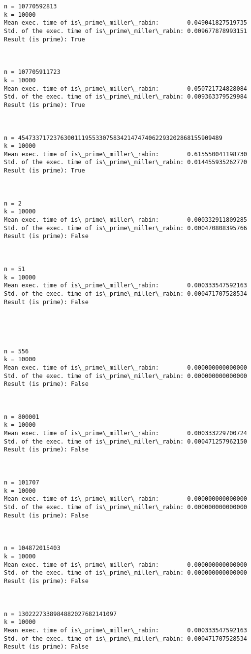 \documentclass[11pt]{article}
\begin{document}
\begin{Verbatim}[commandchars=\\\{\}]
n = 10770592813
k = 10000
Mean exec. time of is\_prime\_miller\_rabin:        0.049041827519735
Std. of the exec. time of is\_prime\_miller\_rabin: 0.009677878993151
Result (is prime): True



n = 107705911723
k = 10000
Mean exec. time of is\_prime\_miller\_rabin:        0.050721724828084
Std. of the exec. time of is\_prime\_miller\_rabin: 0.009363379529984
Result (is prime): True



n = 4547337172376300111955330758342147474062293202868155909489
k = 10000
Mean exec. time of is\_prime\_miller\_rabin:        0.615550041198730
Std. of the exec. time of is\_prime\_miller\_rabin: 0.014455935262770
Result (is prime): True



n = 2
k = 10000
Mean exec. time of is\_prime\_miller\_rabin:        0.000332911809285
Std. of the exec. time of is\_prime\_miller\_rabin: 0.000470808395766
Result (is prime): False



n = 51
k = 10000
Mean exec. time of is\_prime\_miller\_rabin:        0.000333547592163
Std. of the exec. time of is\_prime\_miller\_rabin: 0.000471707528534
Result (is prime): False





n = 556
k = 10000
Mean exec. time of is\_prime\_miller\_rabin:        0.000000000000000
Std. of the exec. time of is\_prime\_miller\_rabin: 0.000000000000000
Result (is prime): False



n = 800001
k = 10000
Mean exec. time of is\_prime\_miller\_rabin:        0.000333229700724
Std. of the exec. time of is\_prime\_miller\_rabin: 0.000471257962150
Result (is prime): False



n = 101707
k = 10000
Mean exec. time of is\_prime\_miller\_rabin:        0.000000000000000
Std. of the exec. time of is\_prime\_miller\_rabin: 0.000000000000000
Result (is prime): False



n = 104872015403
k = 10000
Mean exec. time of is\_prime\_miller\_rabin:        0.000000000000000
Std. of the exec. time of is\_prime\_miller\_rabin: 0.000000000000000
Result (is prime): False



n = 1302227338984882027682141097
k = 10000
Mean exec. time of is\_prime\_miller\_rabin:        0.000333547592163
Std. of the exec. time of is\_prime\_miller\_rabin: 0.000471707528534
Result (is prime): False




\end{Verbatim}
\end{document}
